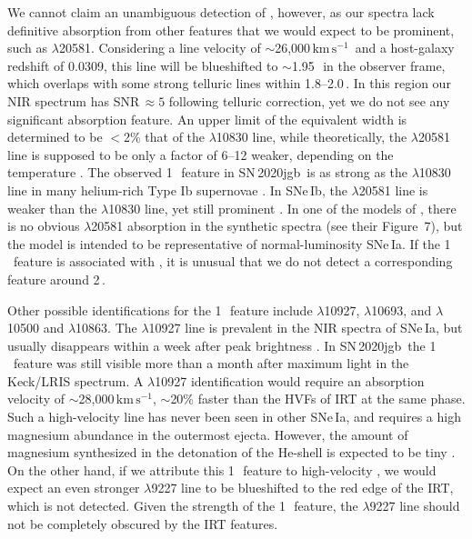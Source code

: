 \documentclass[twocolumn]{aastex631}
\newcommand{\sn}{SN\,2020jgb}
\newcommand{\kms}{$\mathrm{km}\,\mathrm{s}^{-1}$}
\begin{document}
We cannot claim an unambiguous detection of , however, as our spectra lack definitive absorption from other  features that we would expect to be prominent, such as  $\lambda$20581. Considering a line velocity of $\sim$26,000\,\kms\ and a host-galaxy redshift of 0.0309, this line will be blueshifted to $\sim$1.95\,\micron\ in the observer frame, which overlaps with some strong telluric lines within 1.8--2.0\,\micron. In this region our NIR spectrum has SNR$\,\approx 5$ following telluric correction, yet we do not see any significant absorption feature. An upper limit of the equivalent width is determined to be $<$2\% that of the  $\lambda$10830 line, while theoretically, the $\lambda$20581 line is supposed to be only a factor of 6--12 weaker, depending on the temperature \citep{Marion2009_NIR}. The observed 1\,\micron\ feature in \sn\ is as strong as the  $\lambda$10830 line in many helium-rich Type Ib supernovae \citep[SNe\,Ib; see][for a review of SN spectral classification]{Filippenko97, Gal-Yam_2017}. In SNe\,Ib, the  $\lambda$20581 line is weaker than the  $\lambda$10830 line, yet still prominent \citep{CSP_Ibc_2022}. In one of the models of \citet{Boyle2017_Helium}, there is no obvious  $\lambda$20581 absorption in the synthetic spectra (see their Figure~7), but the model is intended to be representative of normal-luminosity SNe\,Ia. If the 1\,\micron\ feature is associated with , it is unusual that we do not detect a corresponding feature around 2\,\micron.

Other possible identifications for the 1\,\micron\ feature include  $\lambda$10927,  $\lambda$10693, and  $\lambda$10500 and $\lambda$10863. The  $\lambda$10927 line is prevalent in the NIR spectra of SNe\,Ia, but usually disappears within a week after peak brightness \citep{Marion2009_NIR}. In \sn\ the 1\,\micron\ feature was still visible more than a month after maximum light in the Keck/LRIS spectrum. A  $\lambda$10927 identification would require an absorption velocity of $\sim$28,000\,\kms, $\sim$20\% faster than the HVFs of  IRT at the same phase. Such a high-velocity  line has never been seen in other SNe\,Ia, and requires a high magnesium abundance in the outermost ejecta. However, the amount of magnesium synthesized in the detonation of the He-shell is expected to be tiny \citep{Fink_DD_2010,Kromer_DD_2010,polin_observational_2019,polin_nebular_2021}. On the other hand, if we attribute this 1\,\micron\ feature to high-velocity , we would expect an even stronger  $\lambda$9227 line to be blueshifted to the red edge of the  IRT, which is not detected. Given the strength of the 1\,\micron\ feature, the  $\lambda$9227 line should not be completely obscured by the  IRT features.
\end{document}
